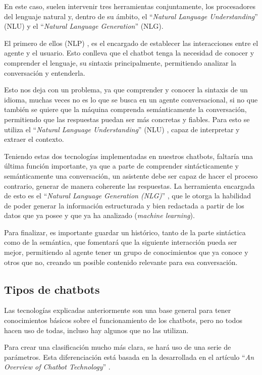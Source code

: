 En este caso, suelen intervenir tres herramientas conjuntamente, los procesadores del lenguaje natural y, dentro de su ámbito, el ``\textit{Natural Language Understanding}'' (NLU) y el ``\textit{Natural Language Generation}'' (NLG).

El primero de ellos (NLP) \cite{nadkarni2011natural}, es el encargado de establecer las interacciones entre el agente y el usuario. Esto conlleva que el chatbot tenga la necesidad de conocer y comprender el lenguaje, su sintaxis principalmente, permitiendo analizar la conversación y entenderla.

Esto nos deja con un problema, ya que comprender y conocer la sintaxis de un idioma, muchas veces no es lo que se busca en un agente conversacional, si no que también se quiere que la máquina comprenda semánticamente la conversación, permitiendo que las respuestas puedan ser más concretas y fiables. Para esto se utiliza el ``\textit{Natural Language Understanding}'' (NLU) \cite{bates1995models}, capaz de interpretar y extraer el contexto.

Teniendo estas dos tecnologías implementadas en nuestros chatbots, faltaría una última función importante, ya que a parte de comprender sintácticamente y semánticamente una conversación, un asistente debe ser capaz de hacer el proceso contrario, generar de manera coherente las respuestas. La herramienta encargada de esto es el ``\textit{Natural Language Generation (NLG)}'' \cite{mcdonald2010natural}, que le otorga la habilidad de poder generar la información estructurada y bien redactada a partir de los datos que ya posee y que ya ha analizado (\textit{machine learning}).

Para finalizar, es importante guardar un histórico, tanto de la parte sintáctica como de la semántica, que fomentará que la siguiente interacción pueda ser mejor, permitiendo al agente tener un grupo de conocimientos que ya conoce y otros que no, creando un posible contenido relevante para esa conversación.

\subsection{Tipos de chatbots}
Las tecnologías explicadas anteriormente son una base general para tener conocimientos básicos sobre el funcionamiento de los chatbots, pero no todos hacen uso de todas, incluso hay algunos que no las utilizan.

Para crear una clasificación mucho más clara, se hará uso de una serie de parámetros. Esta diferenciación está basada en la desarrollada en el artículo ``\textit{An Overview of Chatbot Technology}'' \cite{hussain2019survey}.

